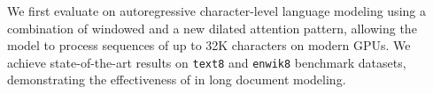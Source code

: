 

We first evaluate \model on autoregressive character-level language modeling using a combination of windowed and a new dilated attention pattern, allowing the model to process sequences of up to 32K characters on modern GPUs. We achieve state-of-the-art results on \texttt{text8} and \texttt{enwik8} benchmark datasets, demonstrating the effectiveness of \model in long document modeling. 


